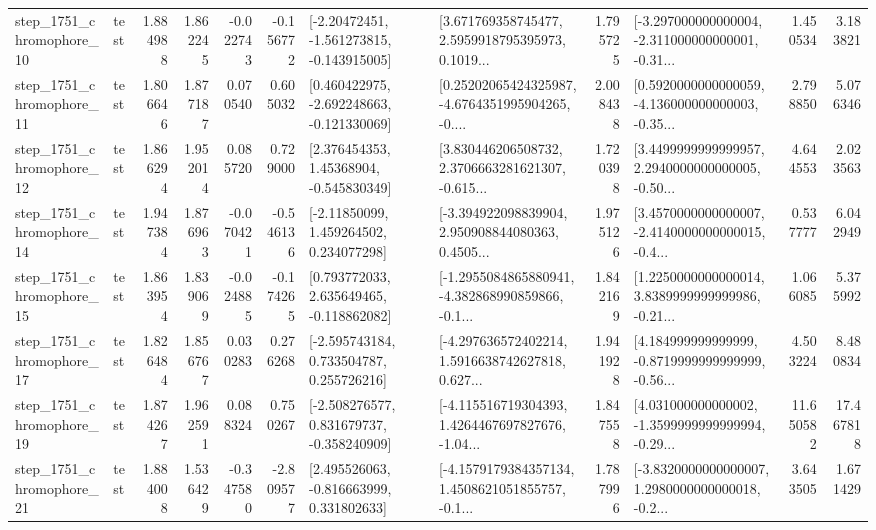 \begin{tabular}{llrrrrllrlrr}
 step\_1751\_chromophore\_10 &      test &      1.884988 &    1.862245 &     -0.022743 & -0.156772 &   [-2.20472451, -1.561273815, -0.143915005] &  [3.671769358745477, 2.5959918795395973, 0.1019... &       1.795725 &  [-3.297000000000004, -2.311000000000001, -0.31... &            1.450534 &          3.183821 \\
 step\_1751\_chromophore\_11 &      test &      1.806646 &    1.877187 &      0.070540 &  0.605032 &   [0.460422975, -2.692248663, -0.121330069] &  [0.25202065424325987, -4.6764351995904265, -0.... &       2.008438 &  [0.5920000000000059, -4.136000000000003, -0.35... &            2.798850 &          5.076346 \\
 step\_1751\_chromophore\_12 &      test &      1.866294 &    1.952014 &      0.085720 &  0.729000 &     [2.376454353, 1.45368904, -0.545830349] &  [3.830446206508732, 2.3706663281621307, -0.615... &       1.720398 &  [3.4499999999999957, 2.2940000000000005, -0.50... &            4.644553 &          2.023563 \\
 step\_1751\_chromophore\_14 &      test &      1.947384 &    1.876963 &     -0.070421 & -0.546136 &     [-2.11850099, 1.459264502, 0.234077298] &  [-3.394922098839904, 2.950908844080363, 0.4505... &       1.975126 &  [3.4570000000000007, -2.4140000000000015, -0.4... &            0.537777 &          6.042949 \\
 step\_1751\_chromophore\_15 &      test &      1.863954 &    1.839069 &     -0.024885 & -0.174265 &    [0.793772033, 2.635649465, -0.118862082] &  [-1.2955084865880941, -4.382868990859866, -0.1... &       1.842169 &  [1.2250000000000014, 3.8389999999999986, -0.21... &            1.066085 &          5.375992 \\
 step\_1751\_chromophore\_17 &      test &      1.826484 &    1.856767 &      0.030283 &  0.276268 &    [-2.595743184, 0.733504787, 0.255726216] &  [-4.297636572402214, 1.5916638742627818, 0.627... &       1.941928 &  [4.184999999999999, -0.8719999999999999, -0.56... &            4.503224 &          8.480834 \\
 step\_1751\_chromophore\_19 &      test &      1.874267 &    1.962591 &      0.088324 &  0.750267 &   [-2.508276577, 0.831679737, -0.358240909] &  [-4.115516719304393, 1.4264467697827676, -1.04... &       1.847558 &  [4.031000000000002, -1.3599999999999994, -0.29... &           11.650582 &         17.467818 \\
 step\_1751\_chromophore\_21 &      test &      1.884008 &    1.536429 &     -0.347580 & -2.809577 &    [2.495526063, -0.816663999, 0.331802633] &  [-4.1579179384357134, 1.4508621051855757, -0.1... &       1.787996 &  [-3.8320000000000007, 1.2980000000000018, -0.2... &            3.643505 &          1.671429 \\

\end{tabular}
